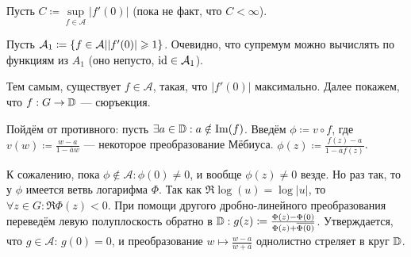 \documentclass[a4paper]{report}
\begin{document}
{{{                Пусть $C \coloneqq \sup\limits_{f \in \mathcal{A}}|f'(0)|$ (пока не факт, что $C < \infty$).

                Пусть $\mathcal{A}_1 \coloneqq \left\{f \in \mathcal{A}\middle||f'(0)| \geqslant 1\right\}$.
                Очевидно, что супремум можно вычислять по функциям из $A_1$ (оно непусто, $\operatorname{id} \in \mathcal{A}_1$).

                Тем самым, существует $f \in \mathcal{A}$, такая, что $|f'(0)|$ максимально.
                Далее покажем, что $f: G \rightarrow \mathbb{D}$ --- сюръекция.

                \item Пойдём от противного: пусть $\exists a \in \mathbb{D}: a \notin \operatorname{Im}(f)$.
                Введём $\phi \coloneqq v \circ f$, где $v(w) \coloneqq \frac{w - a}{1 - \overline{a}w}$ --- некоторое преобразование Мёбиуса.
                $\phi(z) \coloneqq \frac{f(z) - a}{1 - \overline{a}f(z)}$.

                К сожалению, пока $\phi \notin \mathcal{A}: \phi(0) \ne 0$, и вообще $\phi(z) \ne 0$ везде.
                Но раз так, то у $\phi$ имеется ветвь логарифма $\Phi$.
                Так как $\Re\log(u) = \log|u|$, то $\forall z \in G: \Re\Phi(z) < 0$.
                При помощи другого дробно-линейного преобразования переведём левую полуплоскость обратно в $\mathbb{D}: g(z) \coloneqq \frac{\Phi(z) - \Phi(0)}{\Phi(z) + \overline{\Phi(0)}}$.
                Утверждается, что $g \in \mathcal{A}$: $g(0) = 0$, и преобразование $w \mapsto \frac{w - a}{w + \overline{a}}$ однолистно стреляет в круг $\mathbb{D}$.

}}}
\end{document}
